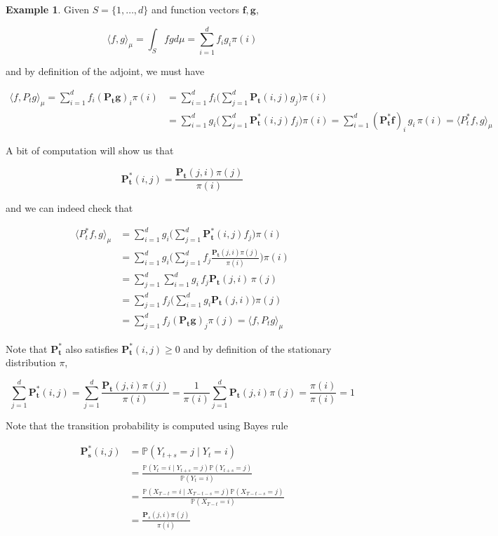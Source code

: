\documentclass{article}
\theoremstyle{definition}
\newtheorem{example}{Example}[section]
\theoremstyle{remark}
\theoremstyle{definition}
\begin{document}
      \begin{example}
      Given $S = \{1, \ldots, d\}$ and function vectors $\mathbf{f}, \mathbf{g}$, 

        \[\langle f, g \rangle_\mu = \int_S f g d\mu = \sum_{i=1}^d f_i g_i \pi(i)\]

      and by definition of the adjoint, we must have 

      \begin{align*}
        \langle f, P_t g \rangle_\mu = \sum_{i=1}^d f_i (\mathbf{P_t} \mathbf{g})_i \pi(i) & = \sum_{i=1}^d f_i \bigg( \sum_{j=1}^d \mathbf{P_t}(i, j) g_j \bigg) \pi(i) \\
        & = \sum_{i=1}^d g_i \bigg( \sum_{j=1}^d \mathbf{P_t^*} (i, j) f_j \bigg) \pi(i) = \sum_{i=1}^d (\mathbf{P_t^*} \mathbf{f})_i \, g_i \, \pi(i) = \langle P_t^* f, g \rangle_\mu 
      \end{align*}

      A bit of computation will show us that 

        \[\mathbf{P_t^*}(i, j) = \frac{\mathbf{P_t}(j, i) \pi(j)}{\pi(i)}\]

      and we can indeed check that 

      \begin{align*}
        \langle P_t^* f, g \rangle_\mu  & = \sum_{i=1}^d g_i \bigg( \sum_{j=1}^d \mathbf{P_t^*} (i, j) f_j \bigg) \pi(i) \\
        & = \sum_{i=1}^d g_i \bigg( \sum_{j=1}^d f_j \frac{\mathbf{P_t}(j, i) \pi(j)}{\pi(i)} \bigg) \pi(i) \\
        & = \sum_{j=1}^d \sum_{i=1}^d g_i \, f_j \mathbf{P_t}(j, i) \, \pi(j) \\
        & = \sum_{j=1}^d f_j \bigg( \sum_{i=1}^d g_i \mathbf{P_t}(j, i) \bigg) \pi(j) \\
        & = \sum_{j=1}^d f_j (\mathbf{P_t} \mathbf{g})_j \pi(j) = \langle f, P_t g \rangle_\mu
      \end{align*}

      Note that $\mathbf{P_t^*}$ also satisfies $\mathbf{P_t^*} (i, j) \geq 0$ and by definition of the stationary distribution $\pi$, 

        \[\sum_{j=1}^d \mathbf{P_t^*} (i, j) = \sum_{j=1}^d \frac{\mathbf{P_t}(j, i) \pi(j)}{\pi(i)} = \frac{1}{\pi(i)} \sum_{j=1}^d \mathbf{P_t}(j, i) \pi(j) = \frac{\pi(i)}{\pi(i)} = 1 \]

      Note that the transition probability is computed using Bayes rule 

      \begin{align*}
        \mathbf{P_s^*}(i, j) & = \mathbb{P}(Y_{t + s} = j \mid Y_t = i) \\
        & = \frac{\mathbb{P}(Y_t = i \mid Y_{t + s} = j) \mathbb{P}(Y_{t + s} = j)}{\mathbb{P}(Y_t = i)} \\
        & = \frac{\mathbb{P}(X_{T - t} = i \mid X_{T - t - s} = j) \mathbb{P}(X_{T - t - s} = j)}{\mathbb{P}(X_{T - t} = i)} \\
        & = \frac{\mathbf{P}_s (j, i) \pi(j)}{\pi(i)}
      \end{align*}
      \end{example}
\end{document}
